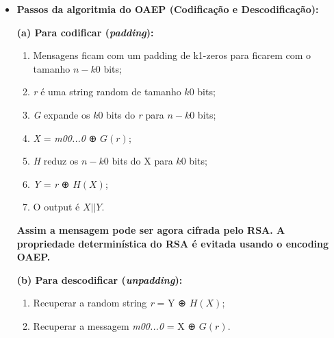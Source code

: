 \documentclass[12pt]{report}
\providecommand{\tightlist}{%
      \setlength{\itemsep}{0pt}\setlength{\parskip}{0pt}}
\begin{document}
\begin{itemize}
\item
  \textbf{Passos da algoritmia do OAEP (Codificação e Descodificação):}
\vspace{3 mm}

  	\textbf{(a) Para codificar (\emph{padding}):}

	  \begin{enumerate}
	  \def\labelenumi{\arabic{enumi}.}
	  \tightlist
	  \item
	    Mensagens ficam com um padding de k1-zeros para ficarem com o
	    tamanho \(n - k0\) bits;
\vspace{2 mm}
	  \item
	    \emph{r} é uma string random de tamanho \(k0\) bits;
\vspace{2 mm}
	  \item
	    \emph{G} expande os \(k0\) bits do \emph{r} para \(n − k0\) bits;
\vspace{2 mm}
	  \item
	    \emph{X} = \emph{m00...0} ⊕ \(G(r)\);
\vspace{2 mm}
	  \item
	    \emph{H} reduz os \(n − k0\) bits do X para \(k0\) bits;
\vspace{2 mm}
	  \item
	    \emph{Y} = \emph{r} ⊕ \(H(X)\);
\vspace{2 mm}
	  \item
	    O output é \(X || Y\).
	  \end{enumerate}
\vspace{2 mm}
\textbf{Assim a mensagem pode ser agora cifrada pelo RSA. A propriedade determinística do RSA é evitada usando o encoding OAEP.}
\newpage

	  \textbf{(b) Para descodificar (\emph{unpadding}):}
	
	  \begin{enumerate}
	  \def\labelenumi{\arabic{enumi}.}
	  \tightlist
	  \item
	    Recuperar a random string \emph{r} = Y ⊕ \(H(X)\);
\vspace{2 mm}
	  \item
	    Recuperar a messagem \emph{m00...0} = X ⊕ \(G(r)\).
	  \end{enumerate}


\end{itemize}
\vspace{6 mm}
\end{document}
